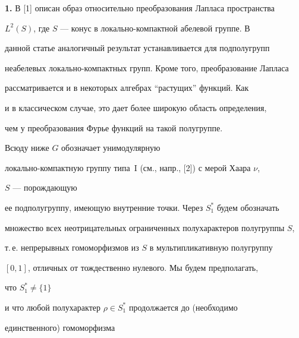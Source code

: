 \date{}




\pagestyle{plain} %







\maketitle


\label{begin}








{\bf 1.} В [1] описан образ относительно преобразования Лапласа пространства


$L^2(S)$, где $S$ --- конус в локально-компактной абелевой группе. В


данной статье аналогичный результат устанавливается для подполугрупп


неабелевых локально-компактных групп. Кроме того, преобразование Лапласа


рассматривается и в некоторых алгебрах ``растущих'' функций. Как


и в классическом случае, это дает более широкую область определения,


чем у преобразования Фурье функций на такой полугруппе.








Всюду ниже $G$ обозначает унимодулярную


локально-компактную группу типа~I (см., напр., [2]) с мерой Хаара $\nu$,


$S$ --- порождающую


ее подполугруппу, имеющую внутренние точки. Через $S_1^*$ будем обозначать


множество всех неотрицательных ограниченных полухарактеров полугруппы $S$,


т.\,е. непрерывных гомоморфизмов из $S$ в мультипликативную полугруппу


$[0,1]$, отличных от тождественно нулевого. Мы будем предполагать,


что $S_1^*\ne \{1\}$


и что любой полухарактер $\rho\in S_1^*$ продолжается до (необходимо


единственного) гомоморфизма


